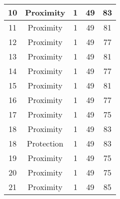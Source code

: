 \documentclass[results.tex]{subfiles}
\begin{document}
\begin{center}
\begin{tabular}{| c || c | c | c | c |}
            \hline
            10                      & Proximity                    & 1                      & 49                      & 83                   \\
            \hline
            11                      & Proximity                    & 1                      & 49                      & 81                   \\
            \hline
            12                      & Proximity                    & 1                      & 49                      & 77                   \\
            \hline
            13                      & Proximity                    & 1                      & 49                      & 81                   \\
            \hline
            14                      & Proximity                    & 1                      & 49                      & 77                   \\
            \hline
            15                      & Proximity                    & 1                      & 49                      & 81                   \\
            \hline
            16                      & Proximity                    & 1                      & 49                      & 77                   \\
            \hline
            17                      & Proximity                    & 1                      & 49                      & 75                   \\
            \hline
            18                      & Proximity                    & 1                      & 49                      & 83                   \\
            \hline
            18                      & Protection                   & 1                      & 49                      & 83                   \\
            \hline
            19                      & Proximity                    & 1                      & 49                      & 75                   \\
            \hline
            20                      & Proximity                    & 1                      & 49                      & 75                   \\
            \hline
            21                      & Proximity                    & 1                      & 49                      & 85                   \\

\end{tabular}
\end{center}
\end{document}
